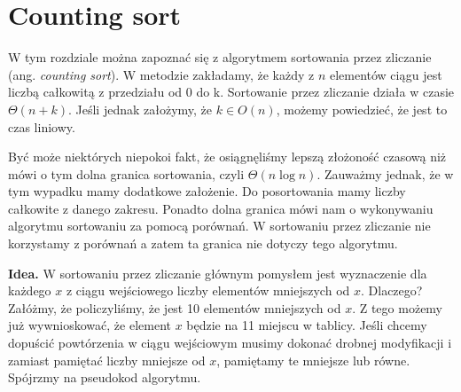 \section{Counting sort}

\label{sec:countingsort}

W tym rozdziale można zapoznać się z algorytmem sortowania przez zliczanie (ang. \textit{counting sort}). 
W metodzie zakładamy, że każdy z $n$ elementów ciągu jest liczbą całkowitą z przedziału od 0 do k.
Sortowanie przez zliczanie działa w czasie $\Theta(n+k)$.
Jeśli jednak założymy, że $k \in O(n)$, możemy powiedzieć, że jest to czas liniowy.

Być może niektórych niepokoi fakt, że osiągnęliśmy lepszą złożoność czasową niż mówi o tym dolna granica sortowania, czyli $\Theta(n \log n)$.
Zauważmy jednak, że w tym wypadku mamy dodatkowe założenie.
Do posortowania mamy liczby całkowite z danego zakresu.
Ponadto dolna granica mówi nam o wykonywaniu algorytmu sortowaniu za pomocą porównań.
W sortowaniu przez zliczanie nie korzystamy z porównań a zatem ta granica nie dotyczy tego algorytmu.

\textbf{Idea.} W sortowaniu przez zliczanie głównym pomysłem jest wyznaczenie dla każdego $x$ z ciągu wejściowego liczby elementów mniejszych od $x$.
Dlaczego?
Załóżmy, że policzyliśmy, że jest 10 elementów mniejszych od $x$.
Z tego możemy już wywnioskować, że element $x$ będzie na 11 miejscu w tablicy.
Jeśli chcemy dopuścić powtórzenia w ciągu wejściowym musimy dokonać drobnej modyfikacji i zamiast pamiętać liczby mniejsze od $x$, pamiętamy te mniejsze lub równe.
Spójrzmy na pseudokod algorytmu.


